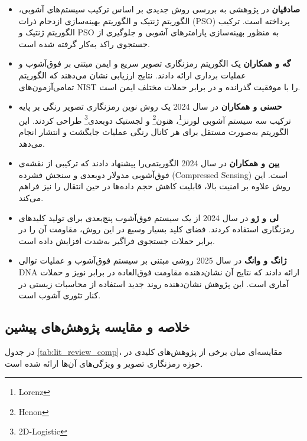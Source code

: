 \documentclass[a4paper,12pt]{report}
\renewcommand{\%}{\lr{\oldpercent}}
\providecommand{\lr}[1]{#1}
\providecommand{\LTRfootnote}[1]{\footnote{#1}}
\begin{document}
\begin{itemize}
    \item \textbf{صادقیان\cite{ref11}} در پژوهشی به بررسی روش جدیدی بر اساس ترکیب سیستم‌های آشوبی، الگوریتم ژنتیک و الگوریتم بهینه‌سازی ازدحام ذرات (\lr{PSO}) پرداخته است. ترکیب الگوریتم ژنتیک و \lr{PSO} به منظور بهینه‌سازی پارامترهای آشوبی و جلوگیری از جستجوی راکد به‌کار گرفته شده است.
    \item \textbf{گه و همکاران\cite{ref12}} یک الگوریتم رمزنگاری تصویر سریع و ایمن مبتنی بر فوق‌آشوب و عملیات برداری ارائه دادند. نتایج ارزیابی نشان می‌دهند که الگوریتم تمامی‌آزمون‌های \lr{NIST} را با موفقیت گذرانده و در برابر حملات مختلف ایمن است.
    \item \textbf{حسنی و همکاران\cite{ref13}} در سال 2024 یک روش نوین رمزنگاری تصویر رنگی بر پایه ترکیب سه سیستم آشوبی لورنز\LTRfootnote{Lorenz}، هنون\LTRfootnote{Henon} و لجستیک دوبعدی\LTRfootnote{2D-Logistic} طراحی کردند. این الگوریتم به‌صورت مستقل برای هر کانال رنگی عملیات جایگشت و انتشار انجام می‌دهد.
    \item \textbf{یین و همکاران\cite{ref1}} در سال 2024 الگوریتمی‌را پیشنهاد دادند که ترکیبی از نقشه‌ی فوق‌آشوبی مدولار دوبعدی و سنجش فشرده (\lr{Compressed Sensing}) است. این روش علاوه بر امنیت بالا، قابلیت کاهش حجم داده‌ها در حین انتقال را نیز فراهم می‌کند.
    \item \textbf{لی و ژو\cite{ref52}} در سال 2024 از یک سیستم فوق‌آشوب پنج‌بعدی برای تولید کلیدهای رمزنگاری استفاده کردند. فضای کلید بسیار وسیع در این روش، مقاومت آن را در برابر حملات جستجوی فراگیر به‌شدت افزایش داده است.
    \item \textbf{ژانگ و وانگ\cite{ref51}} در سال 2025 روشی مبتنی بر سیستم فوق‌آشوب و عملیات توالی \lr{DNA} ارائه دادند که نتایج آن نشان‌دهنده مقاومت فوق‌العاده در برابر نویز و حملات آماری است. این پژوهش نشان‌دهنده روند جدید استفاده از محاسبات زیستی در کنار تئوری آشوب است.
\end{itemize}

\subsection{خلاصه و مقایسه پژوهش‌های پیشین}
در جدول \ref{tab:lit_review_comp}، مقایسه‌ای میان برخی از پژوهش‌های کلیدی در حوزه رمزنگاری تصویر و ویژگی‌های آن‌ها ارائه شده است.
\end{document}
